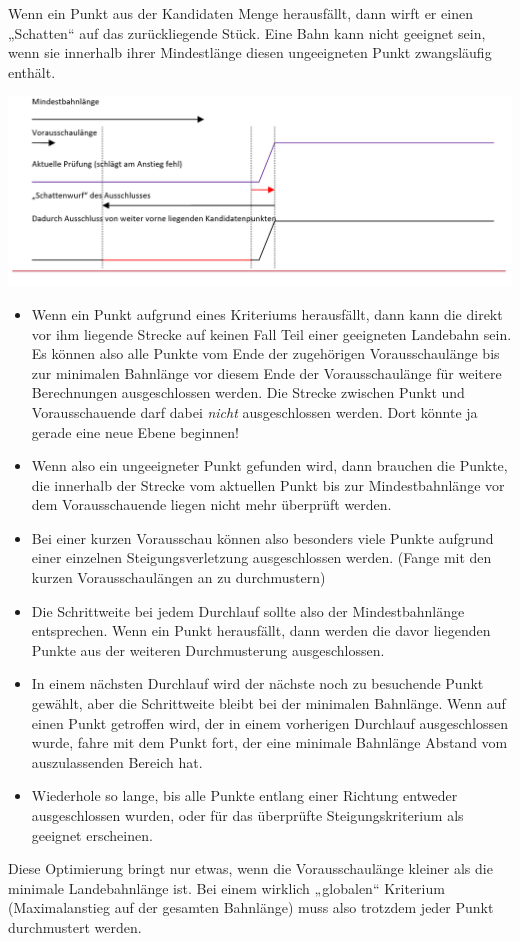 \documentclass[
11pt, %
a4paper, %
oneside, %
pdfspacing, %
headinclude,
BCOR5mm, %
ngerman, %
bibtotocnumbered,
]{scrartcl}
\begin{document}
Wenn ein Punkt aus der Kandidaten Menge herausfällt, dann wirft er einen „Schatten“ auf das zurückliegende Stück. Eine Bahn kann nicht geeignet sein, wenn sie innerhalb ihrer Mindestlänge diesen ungeeigneten Punkt zwangsläufig enthält.

\includegraphics[width=\textwidth]{./drawings/Schattenwurf_Optimierung.png}

\begin{itemize}
\item Wenn ein Punkt aufgrund eines Kriteriums herausfällt, dann kann die direkt vor ihm liegende Strecke auf keinen Fall Teil einer geeigneten Landebahn sein. 
Es können also alle Punkte vom Ende der zugehörigen Vorausschaulänge bis zur minimalen Bahnlänge vor diesem Ende der Vorausschaulänge für weitere Berechnungen ausgeschlossen werden. Die Strecke zwischen Punkt und Vorausschauende darf dabei \emph{nicht} ausgeschlossen werden. Dort könnte ja gerade eine neue Ebene beginnen!
\item Wenn also ein ungeeigneter Punkt gefunden wird, dann brauchen die Punkte, die innerhalb der Strecke vom aktuellen Punkt bis zur Mindestbahnlänge vor dem Vorausschauende liegen nicht mehr überprüft werden.
\item Bei einer kurzen Vorausschau können also besonders viele Punkte aufgrund einer einzelnen Steigungsverletzung ausgeschlossen werden. (Fange mit den kurzen Vorausschaulängen an zu durchmustern)
\item Die Schrittweite bei jedem Durchlauf sollte also der Mindestbahnlänge entsprechen. Wenn ein Punkt herausfällt, dann werden die davor liegenden Punkte aus der weiteren Durchmusterung ausgeschlossen.
\item In einem nächsten Durchlauf wird der nächste noch zu besuchende Punkt gewählt, aber die Schrittweite bleibt bei der minimalen Bahnlänge. Wenn auf einen Punkt getroffen wird, der in einem vorherigen Durchlauf ausgeschlossen wurde, fahre mit dem Punkt fort, der eine minimale Bahnlänge Abstand vom auszulassenden Bereich hat.
\item Wiederhole so lange, bis alle Punkte entlang einer Richtung entweder ausgeschlossen wurden, oder für das überprüfte Steigungskriterium als geeignet erscheinen.

\end{itemize}
Diese Optimierung bringt nur etwas, wenn die Vorausschaulänge kleiner als die minimale Landebahnlänge ist. Bei einem wirklich „globalen“ Kriterium (Maximalanstieg auf der gesamten Bahnlänge) muss also trotzdem jeder Punkt durchmustert werden.
\end{document}
